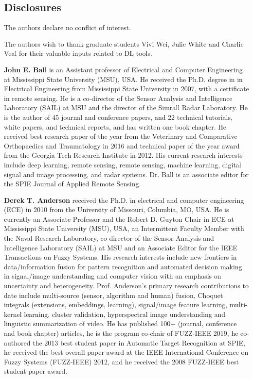 \documentclass[12pt]{spieman}
\begin{document}
\begin{spacing}{1}
\subsection*{Disclosures}
The authors declare no conflict of interest.

\acknowledgments
The authors wish to thank graduate students Vivi Wei, Julie White and Charlie Veal for their valuable inputs related to DL tools.



\vspace{2ex}\noindent\textbf{John E. Ball} is an Assistant professor of Electrical and Computer Engineering at Mississippi State University (MSU), USA. He received the Ph.D. degree in in Electrical Engineering from Mississippi State University in 2007, with a certificate in remote sensing. He is a co-director of the Sensor Analysis and Intelligence Laboratory (SAIL) at MSU and the director of the Simrall Radar Laboratory. He is the author of 45 journal and conference papers, and 22 technical tutorials, white papers, and technical reports, and has written one book chapter. He received best research paper of the year from the Veterinary and Comparative Orthopaedics and Traumatology in 2016 and technical paper of the year award from the Georgia Tech Research Institute in 2012. His current research interests include deep learning, remote sensing, remote sensing, machine learning, digital signal and image processing, and radar systems. Dr. Ball is an associate editor for the SPIE Journal of Applied Remote Sensing.

\vspace{1ex}
\vspace{2ex}\noindent\textbf{Derek T. Anderson} received the Ph.D. in electrical and computer engineering (ECE) in 2010 from the University of Missouri, Columbia, MO, USA. He is currently an Associate Professor and the Robert D. Guyton Chair in ECE at Mississippi State University (MSU), USA, an Intermittent Faculty Member with the Naval Research Laboratory, co-director of the Sensor Analysis and Intelligence Laboratory (SAIL) at MSU and an Associate Editor for the IEEE Transactions on Fuzzy Systems. His research interests include new frontiers in data/information fusion for pattern recognition and automated decision making in signal/image understanding and computer vision with an emphasis on uncertainty and heterogeneity. Prof. Anderson's primary research contributions to date include multi-source (sensor, algorithm and human) fusion, Choquet integrals (extensions, embeddings, learning), signal/image feature learning, multi-kernel learning, cluster validation, hyperspectral image understanding and linguistic summarization of video. He has published 100+ (journal, conference and book chapter) articles, he is the program co-chair of FUZZ-IEEE 2019, he co-authored the 2013 best student paper in Automatic Target Recognition at SPIE, he received the best overall paper award at the IEEE International Conference on Fuzzy Systems (FUZZ-IEEE) 2012, and he received the 2008 FUZZ-IEEE best student paper award.


\end{spacing}
\end{document}
